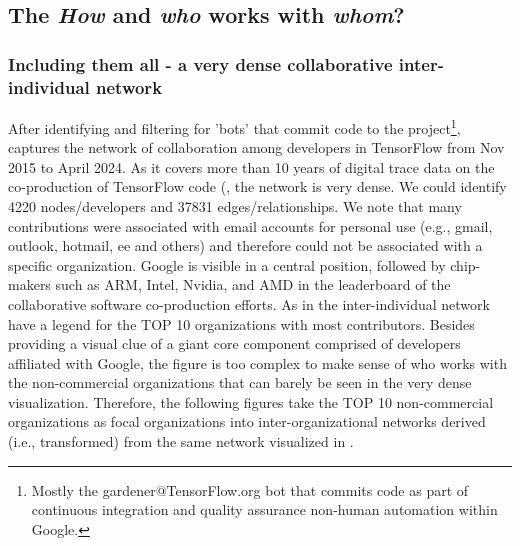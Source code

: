 \documentclass[CHICAGO,Times1COL]{WileyNJDv5} %
\begin{document}






\subsection{The \textit{How} and \textit{who} works with \textit{whom}?}



\subsubsection{Including them all - a very dense collaborative inter-individual network}

After identifying and filtering for 'bots' that commit code to the project\footnote{Mostly the gardener@TensorFlow.org bot that commits code as part of continuous integration and quality assurance non-human automation within Google.},  captures the 
network of collaboration among developers in TensorFlow from Nov 2015 to April 2024. As it covers more than 10 years of digital trace data on the co-production of TensorFlow code (, the network is very dense. We could identify 4220 nodes/developers and 37831 edges/relationships. 
We note that many contributions were associated with email accounts for personal use (e.g., gmail, outlook, hotmail, ee and others) and therefore could not be associated with a specific organization. Google is visible in a central position, followed by chip-makers such as ARM, Intel, Nvidia, and AMD  in the leaderboard of the collaborative software co-production efforts. As in \citet{teixeira2015lessons,TeixeiraMian_et_al2016} the inter-individual network have a legend for the TOP 10 organizations with most contributors. Besides providing a visual clue of a giant core component comprised of developers affiliated with Google, the figure is too complex to make sense of who works with the non-commercial organizations that can barely be seen in the very dense visualization.  Therefore, the following figures take the TOP 10  non-commercial organizations as focal organizations into inter-organizational networks derived (i.e., transformed) from the same network visualized in  .
\end{document}
